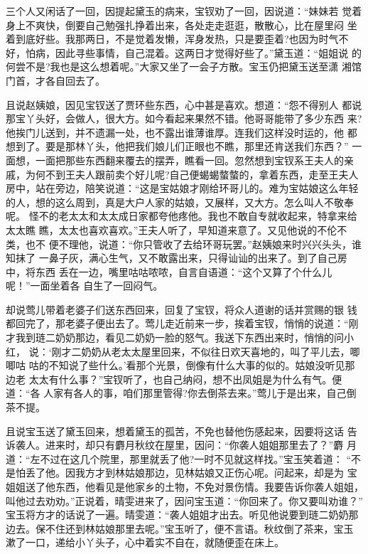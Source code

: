 三个人又闲话了一回，因提起黛玉的病来，宝钗劝了一回，因说道：“妹妹若
觉着身上不爽快，倒要自己勉强扎挣着出来，各处走走逛逛，散散心，比在屋里闷
坐着到底好些。我那两日，不是觉着发懒，浑身发热，只是要歪着?也因为时气不
好，怕病，因此寻些事情，自己混着。这两日才觉得好些了。”黛玉道：“姐姐说
的何尝不是?我也是这么想着呢。”大家又坐了一会子方散。宝玉仍把黛玉送至潇
湘馆门首，才各自回去了。

且说赵姨娘，因见宝钗送了贾环些东西，心中甚是喜欢。想道：“怨不得别人
都说那宝丫头好，会做人，很大方。如今看起来果然不错。他哥哥能带了多少东西
来?他挨门儿送到，并不遗漏一处，也不露出谁薄谁厚。连我们这样没时运的，他
都想到了。要是那林丫头，他把我们娘儿们正眼也不瞧，那里还肯送我们东西？”
一面想，一面把那些东西翻来覆去的摆弄，瞧看一回。忽然想到宝钗系王夫人的亲
戚，为何不到王夫人跟前卖个好儿呢?自己便蝎蝎螫螫的，拿着东西，走至王夫人
房中，站在旁边，陪笑说道：“这是宝姑娘才刚给环哥儿的。难为宝姑娘这么年轻
的人，想的这么周到，真是大户人家的姑娘，又展样，又大方。怎么叫人不敬奉呢。
怪不的老太太和太太成日家都夸他疼他。我也不敢自专就收起来，特拿来给太太瞧
瞧，太太也喜欢喜欢。”王夫人听了，早知道来意了。又见他说的不伦不类，也不
便不理他，说道：“你只管收了去给环哥玩罢。”赵姨娘来时兴兴头头，谁知抹了
一鼻子灰，满心生气，又不敢露出来，只得讪讪的出来了。到了自己房中，将东西
丢在一边，嘴里咕咕哝哝，自言自语道：“这个又算了个什么儿呢！”一面坐着各
自生了一回闷气。

却说莺儿带着老婆子们送东西回来，回复了宝钗，将众人道谢的话并赏赐的银
钱都回完了，那老婆子便出去了。莺儿走近前来一步，挨着宝钗，悄悄的说道：“刚
才我到琏二奶奶那边，看见二奶奶一脸的怒气。我送下东西出来时，悄悄的问小红，
说：‘刚才二奶奶从老太太屋里回来，不似往日欢天喜地的，叫了平儿去，唧唧咕
咕的不知说了些什么。’看那个光景，倒像有什么大事的似的。姑娘没听见那边老
太太有什么事？”宝钗听了，也自己纳闷，想不出凤姐是为什么有气。便道：“各
人家有各人的事，咱们那里管得?你去倒茶去来。”莺儿于是出来，自己倒茶不提。

且说宝玉送了黛玉回来，想着黛玉的孤苦，不免也替他伤感起来，因要将这话
告诉袭人。进来时，却只有麝月秋纹在屋里，因问：“你袭人姐姐那里去了？”麝
月道：“左不过在这几个院里，那里就丢了他?一时不见就这样找。”宝玉笑着道：
“不是怕丢了他。因我方才到林姑娘那边，见林姑娘又正伤心呢。问起来，却是为
宝姐姐送了他东西，他看见是他家乡的土物，不免对景伤情。我要告诉你袭人姐姐，
叫他过去劝劝。”正说着，晴雯进来了，因问宝玉道：“你回来了。你又要叫劝谁？”
宝玉将方才的话说了一遍。晴雯道：“袭人姐姐才出去。听见他说要到琏二奶奶那
边去。保不住还到林姑娘那里去呢。”宝玉听了，便不言语。秋纹倒了茶来，宝玉
漱了一口，递给小丫头子，心中着实不自在，就随便歪在床上。

